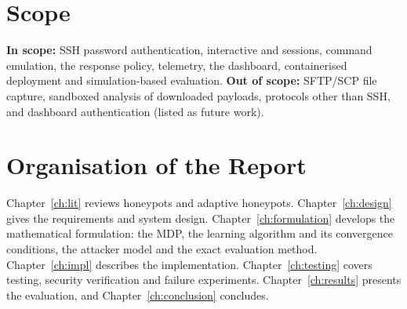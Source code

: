 \section{Scope}

\textbf{In scope:} SSH password authentication, interactive and  sessions, command
emulation, the response policy, telemetry, the dashboard, containerised deployment and
simulation-based evaluation.
\textbf{Out of scope:} SFTP/SCP file capture, sandboxed analysis of downloaded payloads,
protocols other than SSH, and dashboard authentication (listed as future work).

\section{Organisation of the Report}

Chapter~\ref{ch:lit} reviews honeypots and adaptive honeypots. Chapter~\ref{ch:design} gives
the requirements and system design. Chapter~\ref{ch:formulation} develops the mathematical
formulation: the MDP, the learning algorithm and its convergence conditions, the attacker
model and the exact evaluation method. Chapter~\ref{ch:impl} describes the implementation.
Chapter~\ref{ch:testing} covers testing, security verification and failure experiments.
Chapter~\ref{ch:results} presents the evaluation, and Chapter~\ref{ch:conclusion} concludes.
